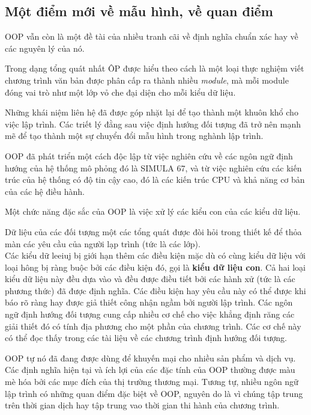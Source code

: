 \documentclass[10pt, a4paper]{article}
\begin{document}
\subsection{Một điểm mới về mẫu hình, về quan điểm}
OOP vẫn còn là một đề tài của nhiều tranh cãi về định nghĩa chuẩn xác hay về các nguyên lý của nó.

Trong dạng tổng quát nhất ÔP được hiểu theo cách là một loại thực nghiệm viết chương trình văn bản được phân cấp ra thành nhiều \emph{module}, mà mỗi module đóng vai trò như một lớp vỏ che đại diện cho mỗi kiểu dữ liệu.

Những khái niệm liên hệ đã được góp nhặt lại để tạo thành một khuôn khổ cho việc lập trình. Các triết lý đằng sau việc định hướng đối tượng đã trở nên mạnh mẽ để tạo thành một sự chuyển đổi mẫu hình trong nghành lập trình.

OOP đã phát triển một cách độc lập từ việc nghiên cứu về các ngôn ngữ định hướng của hệ thống mô phỏng đó là SIMULA 67, và từ việc nghiên cứu các kiến trúc của hệ thống có độ tin cậy cao, đó là các kiến trúc CPU và khả năng cơ bản của các hệ điều hành.

Một chức năng đặc sắc của OOP là việc xử lý các kiểu con của các kiểu dữ liệu.

Dữ liệu của các đối tượng một các tổng quát được đòi hỏi trong thiết kế để thỏa màn các yêu cầu của người lạp trình (tức là các lớp).\\

Các kiểu dữ leeiuj bị giới hạn thêm các điều kiện mặc dù có cùng kiểu dữ liệu với loại hông bị ràng buộc bởi các điều kiện đó, gọi là {\bf kiểu dữ liệu con}. Cả hai loại kiểu dữ liệu này đều dựa vào và đều được điều tiết bởi các hành xử (tức là các phương thức) đã được định nghĩa. Các điều kiện hay yêu cầu này có thể được khi báo rõ ràng hay được giả thiết công nhận ngầm bởi người lập trình. Các ngôn ngữ định hướng đối tượng cung cấp nhiều cơ chế cho việc khẳng định răng các giải thiết đó có tính địa phương cho một phần của chương trình. Các cơ chế này có thể đọc thấy trong các tài liệu về các chương trình định hướng đối tượng.

OOP tự nó đã đang được dùng để khuyến mại cho nhiều sản phẩm và dịch vụ. Các định nghĩa hiện tại và ích lợi của các đặc tính của OOP thường được màu mè hóa bởi các mục đích của thị trường thương mại. Tương tự, nhiều ngôn ngữ lập trình có những quan điểm đặc biệt về OOP, nguyên do là vì chúng tập trung trên thời gian dịch hay tập trung vao thời gian thi hành của chương trình.\\
\end{document}

